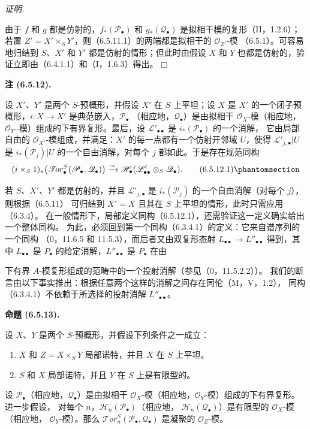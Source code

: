 \documentclass[UTF8,fontset=none,11pt,oneside,openany]{ctexbook}
\providecommand{\square}{\mdlgwhtsquare}
\newenvironment{proposition}[1][]{%
  \par\medskip\noindent\textbf{命题 (#1).}\ %
}{\par}
\newenvironment{proof}{%
  \par\smallskip\noindent\textit{证明.}\ %
}{\hfill$\square$\par}
\newcommand{\oldpage}[2][]{%
  \hypertarget{ega-source-page-#1-#2}{}%
  \marginnote{\scriptsize\textbf{#1}~|~#2}\ignorespaces}
\let\EGAOriginalLabel\label
\renewcommand{\label}[1]{\phantomsection\EGAOriginalLabel{#1}}
\newenvironment{namedtheorem}[2][]{%
  \par\medskip\noindent\textbf{#2 (#1).}\ %
}{\par}
\begin{document}
\begin{proof}
由于 $f$ 和 $g$ 都是仿射的，$f_*(\mathscr P_\bullet)$ 和
$g_*(\mathscr Q_\bullet)$ 是拟相干模的复形（II，1.2.6）；若置
$Z'=X'\times_S Y'$，则（6.5.11.1）的两端都是拟相干的 $\mathscr O_{Z'}$-模
（6.5.1）。可容易地归结到 $S$、$X'$ 和 $Y'$ 都是仿射的情形；但此时由假设
$X$ 和 $Y$ 也都是仿射的，验证立即由（6.4.1.1）和（I，1.6.3）得出。
\end{proof}
\begin{namedtheorem}[6.5.12]{注}
设 $X'$、$Y'$ 是两个 $S$-预概形，并假设 $X'$ 在 $S$ 上平坦；设 $X$ 是
$X'$ 的一个闭子预概形，$i:X\to X'$ 是典范嵌入，$\mathscr P_\bullet$
（相应地，$\mathscr Q_\bullet$）是由拟相干 $\mathscr O_X$-模（相应地，
$\mathscr O_{Y'}$-模）组成的下有界复形。最后，设
$\mathscr L'_{\bullet\bullet}$ 是 $i_*(\mathscr P_\bullet)$ 的一个消解，
它由局部自由的 $\mathscr O_{X'}$-模组成，并满足：$X'$ 的每一点都有一个仿射开邻域
$U$，使得 $\mathscr L'_{j,\bullet}|U$ 是
$i_*(\mathscr P_j)|U$ 的一个自由消解，对每个 $j$ 都如此。于是存在规范同构
\[
  (i\times_S 1)_*
  \bigl(\mathscr{T}\!or_\bullet^S
    (\mathscr P_\bullet,\mathscr Q_\bullet)\bigr)
  \xrightarrow{\sim}
  \mathscr H_\bullet
  (\mathscr L'_{\bullet\bullet}\otimes_S\mathscr Q_\bullet).
  \tag{6.5.12.1}\label{III.6.5.12.1-fr}
\]

若 $S$、$X'$、$Y'$ 都是仿射的，并且
$\mathscr L'_{j,\bullet}$ 是 $i_*(\mathscr P_j)$ 的一个自由消解（对每个 $j$），则根据（6.5.11）
可归结到 $X'=X$ 且其在 $S$ 上平坦的情形，此时只需应用（6.3.4）。
在一般情形下，局部定义同构（6.5.12.1），还需验证这一定义确实给出一个整体同构。
为此，必须回到第一个同构（6.3.4.1）的定义：它来自谱序列的一个同构
（0，11.6.5 和 11.5.3），而后者又由双复形态射
$L_{\bullet\bullet}\to L''_{\bullet\bullet}$ 得到，其中 $L_{\bullet\bullet}$ 是
$P_\bullet$ 的给定消解，$L''_{\bullet\bullet}$ 是 $P_\bullet$ 在由

\oldpage[III]{152}
下有界 $A$-模复形组成的范畴中的一个投射消解（参见（0，11.5.2.2））。
我们的断言由以下事实推出：根据任意两个这样的消解之间存在同伦（M，V，1.2），
同构（6.3.4.1）不依赖于所选择的投射消解 $L''_{\bullet\bullet}$。
\end{namedtheorem}
\begin{proposition}[6.5.13]
设 $X$、$Y$ 是两个 $S$-预概形，并假设下列条件之一成立：
\begin{enumerate}
  \item[(i)] $X$ 和 $Z=X\times_S Y$ 局部诺特，并且 $X$ 在 $S$ 上平坦。
  \item[(ii)] $S$ 和 $X$ 局部诺特，并且 $Y$ 在 $S$ 上是有限型的。
\end{enumerate}
设 $\mathscr P_\bullet$（相应地，$\mathscr Q_\bullet$）是由拟相干
$\mathscr O_X$-模（相应地，$\mathscr O_Y$-模）组成的下有界复形。进一步假设，
对每个 $n$，$\mathscr H_n(\mathscr P_\bullet)$（相应地，
$\mathscr H_n(\mathscr Q_\bullet)$）是有限型的 $\mathscr O_X$-模（相应地，
$\mathscr O_Y$-模）。那么
$\mathscr{T}\!or_n^S(\mathscr P_\bullet,\mathscr Q_\bullet)$ 是凝聚的
$\mathscr O_Z$-模。
\end{proposition}
\end{document}

